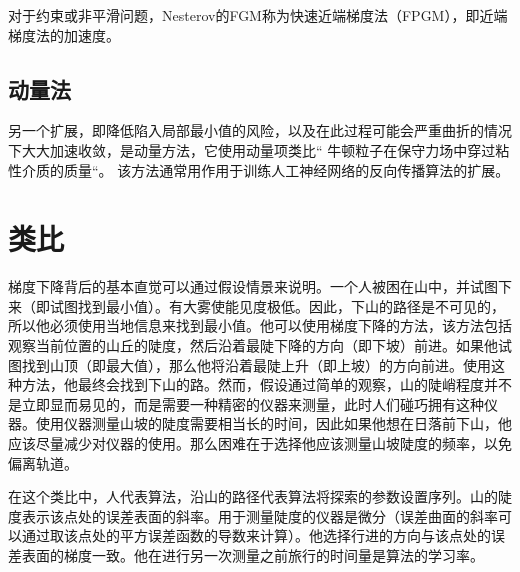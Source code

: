 \documentclass[12pt,a4paper]{article}
\begin{document}
对于约束或非平滑问题，Nesterov的FGM称为快速近端梯度法（FPGM），即近端梯度法的加速度。
\subsection{动量法}
另一个扩展，即降低陷入局部最小值的风险，以及在此过程可能会严重曲折的情况下大大加速收敛，是动量方法，它使用动量项类比“ 牛顿粒子在保守力场中穿过粘性介质的质量“。 该方法通常用作用于训练人工神经网络的反向传播算法的扩展。
\section{类比}
梯度下降背后的基本直觉可以通过假设情景来说明。一个人被困在山中，并试图下来（即试图找到最小值）。有大雾使能见度极低。因此，下山的路径是不可见的，所以他必须使用当地信息来找到最小值。他可以使用梯度下降的方法，该方法包括观察当前位置的山丘的陡度，然后沿着最陡下降的方向（即下坡）前进。如果他试图找到山顶（即最大值），那么他将沿着最陡上升（即上坡）的方向前进。使用这种方法，他最终会找到下山的路。然而，假设通过简单的观察，山的陡峭程度并不是立即显而易见的，而是需要一种精密的仪器来测量，此时人们碰巧拥有这种仪器。使用仪器测量山坡的陡度需要相当长的时间，因此如果他想在日落前下山，他应该尽量减少对仪器的使用。那么困难在于选择他应该测量山坡陡度的频率，以免偏离轨道。

在这个类比中，人代表算法，沿山的路径代表算法将探索的参数设置序列。山的陡度表示该点处的误差表面的斜率。用于测量陡度的仪器是微分（误差曲面的斜率可以通过取该点处的平方误差函数的导数来计算）。他选择行进的方向与该点处的误差表面的梯度一致。他在进行另一次测量之前旅行的时间量是算法的学习率。
\end{document}
